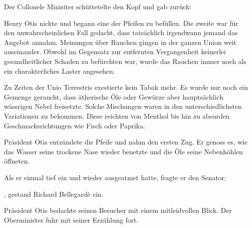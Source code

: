 Der Collonele Minisiter schüttetelte den Kopf und gab zurück: 

\par

Henry Otis nickte und begann eine der Pfeifen zu befüllen. Die zweite war für den unwahrscheinlichen Fall gedacht, dass tatsächlich irgendwann jemand das Angebot annahm. Meinungen über Rauchen gingen in der ganzen Union weit auseinander. Obwohl im Gegensatz zur entfernten Vergangenheit keinerlei gesundheitlicher Schaden zu befürchten war, wurde das Rauchen immer noch als ein charakterliches Laster angesehen.

\par

Zu Zeiten der Unio Terrestris exestierte kein Tabak mehr. Es wurde nur noch ein Gemenge geraucht, dass ätherische Öle oder Gewürze aber hauptsächlich wässrigen Nebel freisetzte. Solche Mischungen waren in den unterschiedlichsten Variationen zu bekommen. Diese reichten von Menthol bis hin zu absurden Geschmacksrichtungen wie Fisch oder Paprika.

\par

Präsident Otis entzündete die Pfeife und nahm den ersten Zug. Er genoss es, wie das Wasser seine trockene Nase wieder benetzte und die Öle seine Nebenhöhlen öffneten.

\par

Als er einmal tief ein und wieder ausgeatmet hatte, fragte er den Senator: 

\par

, gestand Richard Bellegardè ein. 

\par

Präsident Otis bedachte seinen Besucher mit einem mitleidvollen Blick. Der Oberminister fuhr mit seiner Erzählung fort. 

\par

